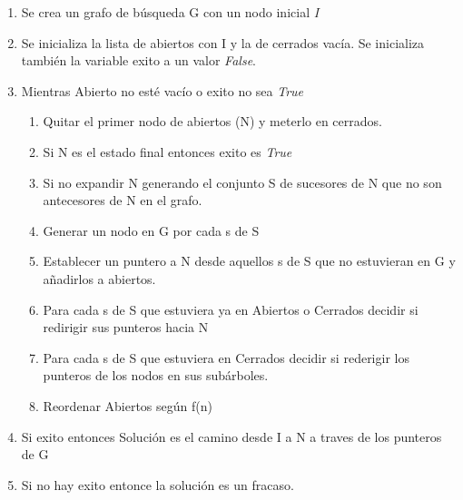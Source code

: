 \documentclass[12pt]{article}
\begin{document}
\begin{enumerate}
\item Se crea un grafo de búsqueda G con un nodo inicial \textit{I}
\item Se inicializa la lista de abiertos con I y la de cerrados vacía. Se inicializa también la variable exito a un valor \textit{False}.
\item Mientras Abierto no esté vacío o exito no sea \textit{True}
  \begin{enumerate}
  \item Quitar el primer nodo de abiertos (N) y meterlo en cerrados.
  \item Si N es el estado final entonces exito es \textit{True}
  \item Si no expandir N generando el conjunto S de sucesores de N que
    no son antecesores de N en el grafo.
  \item Generar un nodo en G por cada s de S
  \item Establecer un puntero a N desde aquellos s de S que no
    estuvieran en G y añadirlos a abiertos.
  \item Para cada s de S que estuviera ya en Abiertos o Cerrados decidir si redirigir sus punteros hacia N
  \item Para cada s de S que estuviera en Cerrados decidir si
    rederigir los punteros de los nodos en sus subárboles.
  \item Reordenar Abiertos según f(n)
  \end{enumerate}
\item Si exito entonces Solución es el camino desde I a N a traves de los punteros de G
\item Si no hay exito entonce la solución es un fracaso.
\end{enumerate}



\end{document}
